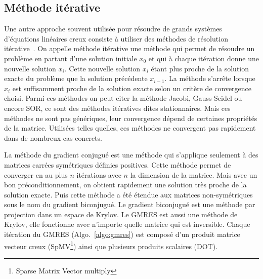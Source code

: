\subsection{Méthode itérative}
Une autre approche souvent utilisée pour résoudre de grands systèmes d'équations linéaires creux consiste à utiliser des méthodes de résolution itérative~\cite{Saad96IMSLS}.
%
On appelle méthode itérative une méthode qui permet de résoudre un problème en partant d'une solution initiale $x_0$ et qui à chaque itération donne une nouvelle solution $x_i$.
%
Cette nouvelle solution $x_i$ étant plus proche de la solution exacte du problème que la solution précédente $x_{i-1}$.
%
La méthode s'arrête lorsque $x_i$ est suffisamment proche de la solution exacte selon un critère de convergence choisi.
%
Parmi ces méthodes on peut citer la méthode Jacobi, Gauss-Seidel ou encore SOR, ce sont des méthodes itératives dites stationnaires.
%
Mais ces méthodes ne sont pas génériques, leur convergence dépend de certaines propriétés de la matrice.
%
Utilisées telles quelles, ces méthodes ne convergent pas rapidement dans de nombreux cas concrets.


La méthode du gradient conjugué est une méthode qui s'applique seulement à des matrices carrées symétriques définies positives.
%
Cette méthode permet de converger en au plus $n$ itérations avec $n$ la dimension de la matrice.
%
Mais avec un bon préconditionnement, on obtient rapidement une solution très proche de la solution exacte.
%
Puis cette méthode a été étendue aux matrices non-symétriques sous le nom du gradient biconjugué.
%
Le gradient biconjugué est une méthode par projection dans un espace de Krylov.
%
Le GMRES est aussi une méthode de Krylov, elle fonctionne avec n'importe quelle matrice qui est inversible.
%
Chaque itération du GMRES (Algo.~\ref{algo:gmres}) est composé d'un produit matrice vecteur creux (SpMV\footnote{Sparse Matrix Vector multiply}) ainsi que plusieurs produits scalaires (DOT).

